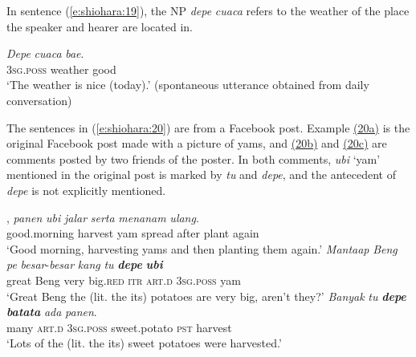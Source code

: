 \documentclass[output=paper
,modfonts
,nonflat]{langsci/langscibook}
\begin{document}
In sentence (\ref{e:shiohara:19}), the NP \textit{depe} \textit{cuaca} refers to the weather of the place the speaker and hearer are located in.

\begin{exe}
	\ex\label{e:shiohara:19}
	\gll \textit{Depe}    \textit{cuaca}    \textit{bae}.\\
	\textsc{3sg.poss}  weather  good\\
	\glt ‘The weather is nice (today).’ (spontaneous utterance obtained from daily conversation)
\end{exe}

\noindent
The sentences in (\ref{e:shiohara:20}) are from a Facebook post. Example \hyperref[e:shiohara:20a]{(20a)} is the original Facebook post made with a picture of yams, and \hyperref[e:shiohara:20b]{(20b)} and \hyperref[e:shiohara:20c]{(20c)} are comments posted by two friends of the poster. In both comments, \textit{ubi} ‘yam’ mentioned in the original post is marked by \textit{tu} and \textit{depe}, and the antecedent of \textit{depe} is not explicitly mentioned.

\begin{exe}
	\ex\label{e:shiohara:20}
	\begin{xlist}
		\ex\label{e:shiohara:20a}
		,  \textit{panen}  \textit{ubi}  \textit{jalar}  \textit{serta}  \textit{menanam}  \textit{ulang}.\\
		good.morning  harvest  yam  spread  after  plant  again\\
		\glt ‘Good morning, harvesting yams and then planting them again.’
		\ex\label{e:shiohara:20b}
		\gll \textit{Mantaap} \textit{Beng} \textit{pe} \textit{besar}-\textit{besar} \textit{kang}   \textit{tu} \textbf{\textit{depe}}  \textbf{\textit{ubi}}{\USQMark}\footnotemark \\
		great  Beng  very  big.\textsc{red}  \textsc{itr}  \textsc{art.d}  \textsc{3sg}.\textsc{poss}  yam\\
		\glt ‘Great Beng the (lit. the its) potatoes are very big, aren’t they?’
		\ex\label{e:shiohara:20c}
		\gll \textit{Banyak}  \textit{tu} \textbf{\textit{depe}}    \textbf{\textit{batata}} \textit{ada}  \textit{panen}.\\
		many  \textsc{art.d}  \textsc{3sg}.\textsc{poss}  sweet.potato  \textsc{pst}  harvest\\
		\glt ‘Lots of the (lit. the its) sweet potatoes were harvested.’
	\end{xlist}
\end{exe}
\end{document}
